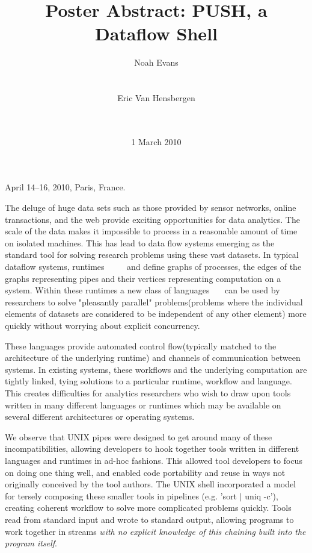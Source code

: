 \documentclass{sig-alt-release2}
\begin{document}
 {April 14--16, 2010, Paris, France.} 
\title{Poster Abstract: PUSH, a Dataflow Shell}

\author{
\alignauthor Noah Evans \\
\\
\\
\alignauthor Eric Van Hensbergen \\
\\
\\
}
\date{1 March 2010}

\maketitle

The deluge of huge data sets such as those provided by sensor
networks, online transactions, and the web provide exciting
opportunities for data analytics.  The scale of the data makes it
impossible to process in a reasonable amount of time on isolated
machines.  This has lead to data flow systems emerging
as the standard tool for solving research problems using these vast
datasets.  In typical dataflow systems,
runtimes~\cite{dean2008msd}~\cite{bialecki:hfr}~\cite{isard2007ddd}
~\cite{streamit} and  define graphs of processes, the edges of the graphs
representing pipes and their vertices representing computation on a
system.  Within these runtimes a new class of
languages~\cite{pike2005idp}~\cite{yu2008dsg}~\cite{olston2008pln} can
be used by researchers to solve "pleasantly parallel" problems(problems where the individual elements of datasets are considered
to be independent of any other element) more quickly without worrying
about explicit concurrency.

These languages provide automated control flow(typically matched
to the architecture of the underlying runtime) and channels of
communication between systems.  In existing systems, these workflows
and the underlying computation are tightly linked, tying solutions
to a particular runtime, workflow and language.  This creates
difficulties for analytics researchers who wish to draw upon tools
written in many different languages or runtimes which may be available
on several different architectures or operating systems.

We observe that UNIX pipes were designed to get around many of these
incompatibilities, allowing developers to hook together tools written
in different languages and runtimes in ad-hoc fashions.  This allowed
tool developers to focus on doing one thing well, and enabled code
portability and reuse in ways not originally conceived by the tool
authors.  The UNIX shell incorporated a model for tersely composing
these smaller tools in pipelines (e.g. 'sort $|$ uniq -c'), creating
coherent workflow to solve more complicated problems quickly.  Tools
read from standard input and wrote to standard output, allowing
programs to work together in streams \emph{with no explicit knowledge
of this chaining built into the program itself}.
\end{document}
